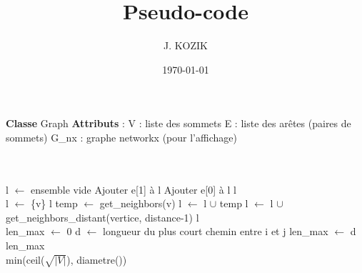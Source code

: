 \documentclass[11pt,a4paper]{article}
\title{Pseudo-code}
\author{J. KOZIK}
\date{\today}
\begin{document}
\begin{tcolorbox}[title=Structure de la classe Graph,colback=blue!10!white,colframe=blue!95!black]
\begin{algorithm}[H]
\begin{algorithmic}[1]
    \State \textbf{Classe} Graph
    \State \textbf{Attributs} :
    \State \hspace{1em} V : liste des sommets
    \State \hspace{1em} E : liste des arêtes (paires de sommets)
    \State \hspace{1em} G\_nx : graphe networkx (pour l'affichage)
    
    	\\
    	\\


        \State l $\gets$ ensemble vide
             \State Ajouter e[1] à l \EndIf
             \State Ajouter e[0] à l \EndIf
        \EndFor
        \State \Return l
    \EndFunction
    \\

        \State l $\gets$ \{v\}
            \State \Return l
        \EndIf
        \State temp $\gets$ get\_neighbors(v)
        \State l $\gets$ l $\cup$ temp
            \State l $\gets$ l $\cup$ get\_neighbors\_distant(vertice, distance-1)
        \EndFor
        \State \Return l
    \EndFunction
    \\

        \State len\_max $\gets$ 0
                \State d $\gets$ longueur du plus court chemin entre i et j
                    \State len\_max $\gets$ d
                \EndIf
            \EndFor
        \EndFor
        \State \Return len\_max
    \EndFunction
    \\

        \State \Return min(ceil($\sqrt{|V|}$), diametre())
    \EndFunction

\end{algorithmic}
\end{algorithm}
\end{tcolorbox}

\newpage
\end{document}
